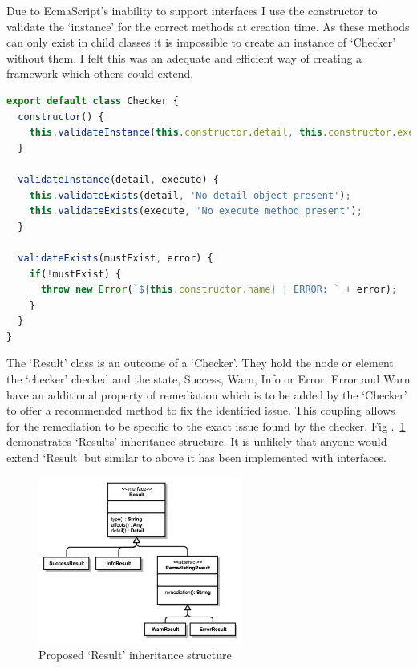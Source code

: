 Due to EcmaScript's inability to support interfaces I use the constructor to
validate the `instance' for the correct methods at creation time. As these
methods can only exist in child classes it is impossible to create an
instance of `Checker' without them. I felt this was an adequate and efficient
way of creating a framework which others could extend.

\begin{lstlisting}[language=JavaScript]
export default class Checker {
  constructor() {
    this.validateInstance(this.constructor.detail, this.constructor.execute);
  }

  validateInstance(detail, execute) {
    this.validateExists(detail, 'No detail object present');
    this.validateExists(execute, 'No execute method present');
  }

  validateExists(mustExist, error) {
    if(!mustExist) {
      throw new Error(`${this.constructor.name} | ERROR: ` + error);
    }
  }
}
\end{lstlisting}

The `Result' class is an outcome of a `Checker'. They hold the node or element
the `checker' checked and the state, Success, Warn, Info or Error.
Error and Warn have an additional property of
remediation which is to be added by the `Checker' to offer a recommended
method to fix the identified issue. This coupling allows for the remediation
to be specific to the exact issue found by the checker. Fig
.~\ref{fig:result_design} demonstrates `Results' inheritance structure. It is
unlikely that anyone would extend `Result' but similar to above it has been
implemented with interfaces.

\begin{figure}[H]
\centering
\includegraphics[width=0.6\textwidth]{figures/a11y_tool_result}
\captionsetup{justification=centering}
\caption{Proposed `Result' inheritance structure
\label{fig:result_design}}
\end{figure}

